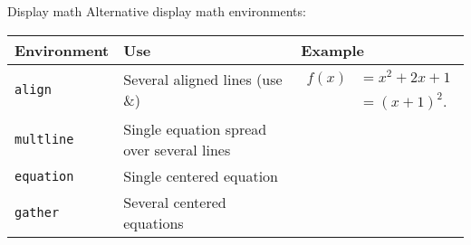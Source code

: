 \copyrightJesse

\begin{frame}[fragile]{Display math}
    Alternative display math environments:
    \begingroup
    \renewcommand\tabularxcolumn[1]{m{#1}}
    \begin{tabularx}{\textwidth}{lp{}X}\hline
        Environment & Use & Example\\\hline
        \texttt{align} & Several aligned lines (use \&) & \parbox{0.4\textwidth}{\vspace{-\baselineskip}
        {\small\begin{align} f(x) &= x^2 + 2x + 1\\
            &= (x+1)^2.\end{align}}\vspace{-\baselineskip}}\vspace{-\baselineskip}\\
        \texttt{multline} & Single equation spread over several lines & ~\vspace{-\baselineskip}{\small\begin{multline}f(x) = x^2+2x+1\\=(x+1)^2.\end{multline}}\vspace{-\baselineskip}\\
        \texttt{equation} & Single centered equation & ~\vspace{-\baselineskip}{\small\begin{equation}f(x) = x^2+2x+1=(x+1)^2.\end{equation}}\vspace{-\baselineskip}\\
        \texttt{gather} & Several centered equations & ~\vspace{-\baselineskip}{\small\begin{gather} f(x) = x^2+2x+1\\=(x+1)^2.\end{gather}}\vspace{-\baselineskip}\\\hline
    \end{tabularx}
    \endgroup
\end{frame}